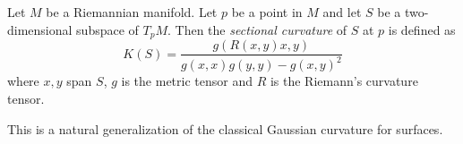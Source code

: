 \documentclass[12pt]{article}
\begin{document}
Let $M$ be a Riemannian manifold. Let $p$ be a point in $M$ and let $S$ be a two-dimensional subspace of $T_pM$. Then the \emph{sectional curvature} of $S$ at $p$ is defined as
$$K(S)=\frac{g(R(x,y)x,y)}{g(x,x)g(y,y)-g(x,y)^2}$$
where $x,y$ span $S$, $g$ is the metric tensor and $R$ is the Riemann's curvature tensor.

This is a natural generalization of the classical Gaussian curvature for surfaces.
\end{document}
